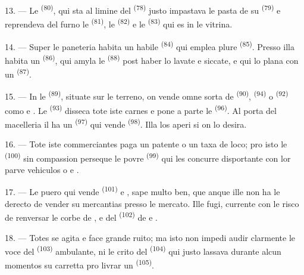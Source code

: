 13. --- Le  \textsuperscript{(80)}, qui sta al limine del
 \textsuperscript{(78)} justo impastava le pasta de su
 \textsuperscript{(79)} e reprendeva del furno le 
\textsuperscript{(81)}, le  \textsuperscript{(82)} e le
 \textsuperscript{(83)} qui es in le vitrina.

14. --- Super le paneteria habita un habile 
\textsuperscript{(84)} qui emplea plure 
\textsuperscript{(85)}. Presso illa habita un 
\textsuperscript{(86)}, qui amyla le  \textsuperscript{(88)} post
haber lo lavate e siccate, e qui lo plana con un 
\textsuperscript{(87)}.

\VUsaut{4.0mm}
\VUsaut{3.0mm}

15. --- In le  \textsuperscript{(89)}, situate sur le terreno,
on vende omne sorta de  \textsuperscript{(90)},
 \textsuperscript{(94)} o 
\textsuperscript{(92)} como  e
. Le  \textsuperscript{(93)}
disseca tote iste carnes e pone a parte le 
\textsuperscript{(96)}. Al porta del macelleria il ha un  \textsuperscript{(97)} qui vende 
\textsuperscript{(98)}. Illa los aperi si on lo desira.

16. --- Tote iste commerciantes paga un patente o un taxa de loco; pro isto le
 \textsuperscript{(100)} sin compassion perseque le povre
 \textsuperscript{(99)} qui les concurre
disportante con lor parve vehiculos 
o  e
.

\VUsaut{4.0mm}
\VUsaut{3.0mm}

17. --- Le puero qui vende  \textsuperscript{(101)} e
, sape multo ben, que anque ille non ha le derecto de vender su
mercantias presso le mercato. Ille fugi, currente con le risco de renversar le
corbe de ,  e  del
 \textsuperscript{(102)} de  e
.

18. --- Totes se agita e face grande ruito; ma isto non impedi audir clarmente le
voce del  \textsuperscript{(103)} ambulante, ni le crito del
 \textsuperscript{(104)} qui justo lassava durante alcun
momentos su carretta pro livrar un 
\textsuperscript{(105)}.
\VUsaut{6.0mm}
\VUfilet{22mm}
